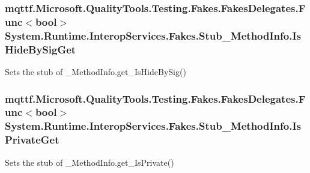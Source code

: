 \hypertarget{class_system_1_1_runtime_1_1_interop_services_1_1_fakes_1_1_stub___method_info_a05db0017c31508bd1a5597a58ee26f37}{
\subsubsection[{Is\-Hide\-By\-Sig\-Get}]{\setlength{\rightskip}{0pt plus 5cm}mqttf.\-Microsoft.\-Quality\-Tools.\-Testing.\-Fakes.\-Fakes\-Delegates.\-Func$<$bool$>$ System.\-Runtime.\-Interop\-Services.\-Fakes.\-Stub\-\_\-\-Method\-Info.\-Is\-Hide\-By\-Sig\-Get}}\label{class_system_1_1_runtime_1_1_interop_services_1_1_fakes_1_1_stub___method_info_a05db0017c31508bd1a5597a58ee26f37}


Sets the stub of \-\_\-\-Method\-Info.\-get\-\_\-\-Is\-Hide\-By\-Sig()

\hypertarget{class_system_1_1_runtime_1_1_interop_services_1_1_fakes_1_1_stub___method_info_a51e0fd4b47f9571f73a0a3976ee114c6}{
\subsubsection[{Is\-Private\-Get}]{\setlength{\rightskip}{0pt plus 5cm}mqttf.\-Microsoft.\-Quality\-Tools.\-Testing.\-Fakes.\-Fakes\-Delegates.\-Func$<$bool$>$ System.\-Runtime.\-Interop\-Services.\-Fakes.\-Stub\-\_\-\-Method\-Info.\-Is\-Private\-Get}}\label{class_system_1_1_runtime_1_1_interop_services_1_1_fakes_1_1_stub___method_info_a51e0fd4b47f9571f73a0a3976ee114c6}


Sets the stub of \-\_\-\-Method\-Info.\-get\-\_\-\-Is\-Private()

